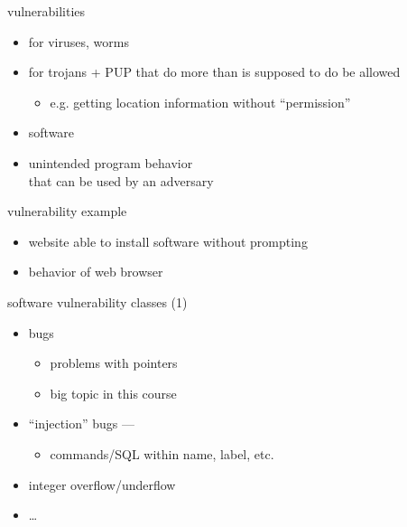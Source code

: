 

\begin{frame}{vulnerabilities}
    \begin{itemize}
    \item for viruses, worms
    \item for trojans + PUP that do more than is supposed to do be allowed
        \begin{itemize}
        \item e.g. getting location information without ``permission''
        \end{itemize}
    \vspace{.5cm}
    \item software 
    \vspace{.5cm}
    \item unintended program behavior \\ that can be used by an adversary
    \end{itemize}
\end{frame}

\begin{frame}{vulnerability example}
    \begin{itemize}
    \item website able to install software without prompting
    \item {} behavior of web browser
    \end{itemize}
\end{frame}


\begin{frame}{software vulnerability classes (1)}
    \begin{itemize}
    \item {} bugs
        \begin{itemize}
        \item problems with pointers
        \item big topic in this course
        \end{itemize}
    \item ``injection'' bugs --- 
        \begin{itemize}
        \item commands/SQL within name, label, etc.
        \end{itemize}
    \item integer overflow/underflow
    \item \ldots
    \end{itemize}
\end{frame}

